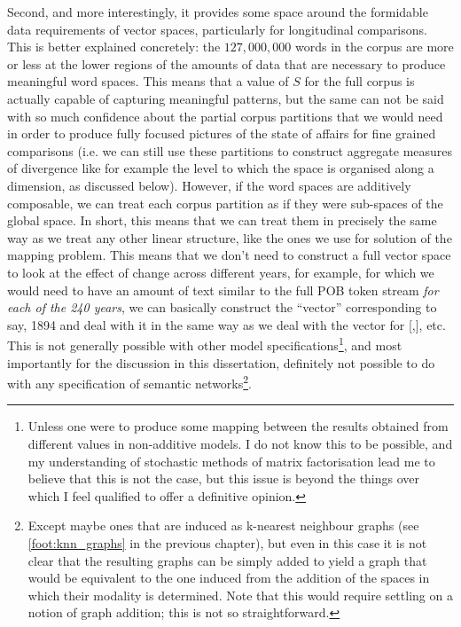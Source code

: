 Second, and more interestingly, it provides some space around the formidable data requirements of vector spaces, particularly for longitudinal comparisons.
This is better explained concretely: the $127,000,000$ words in the corpus are more or less at the lower regions of the amounts of data that are necessary to produce meaningful word spaces.
This means that a value of $S$ for the full corpus is actually capable of capturing meaningful patterns, but the same can not be said with so much confidence about the partial corpus partitions that we would need in order to produce fully focused pictures of the state of affairs for fine grained comparisons (i.e. we can still use these partitions to construct aggregate measures of divergence like for example the level to which the space is organised along a dimension, as discussed below).
However, if the word spaces are additively composable, we can treat each corpus partition as if they were sub-spaces of the global space.
In short, this means that we can treat them in precisely the same way as we treat any other linear structure, like the ones we use for solution of the mapping problem.
This means that we don't need to construct a full vector space to look at the effect of change across different years, for example, for which we would need to have an amount of text similar to the full POB token stream \emph{for each of the 240 years}, we can basically construct the ``vector'' corresponding to say, 1894 and deal with it in the same way as we deal with the vector for [,], etc.
This is not generally possible with other model specifications\footnote{
    Unless one were to produce some mapping between the results obtained from different values in non-additive models.
    I do not know this to be possible, and my understanding of stochastic methods of matrix factorisation lead me to believe that this is not the case, but this issue is beyond the things over which I feel qualified to offer a definitive opinion.
}, and most importantly for the discussion in this dissertation, definitely not possible to do with any specification of semantic networks\footnote{
    Except maybe ones that are induced as k-nearest neighbour graphs (see \autoref{foot:knn_graphs} in the previous chapter), but even in this case it is not clear that the resulting graphs can be simply added to yield a graph that would be equivalent to the one induced from the addition of the spaces in which their modality is determined.
    Note that this would require settling on a notion of graph addition; this is not so straightforward.
}.

